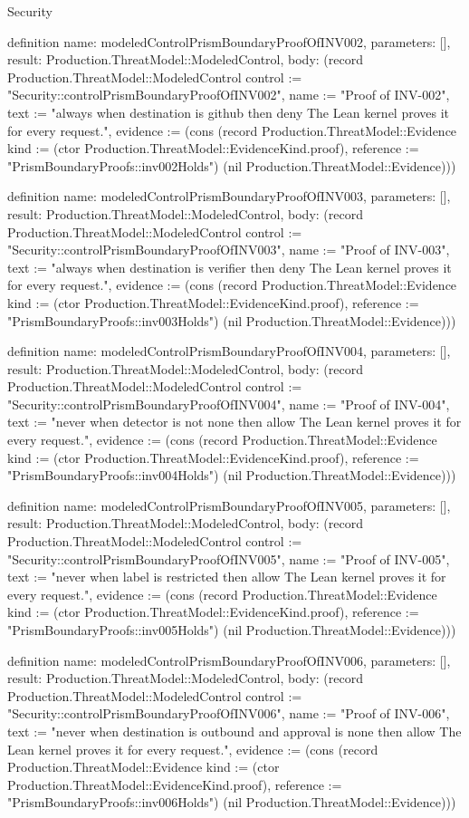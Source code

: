 \begin{lexlean}{Security}
\begin{semanticmodule}
definition{
  name: modeledControlPrismBoundaryProofOfINV002,
  parameters: [],
  result: Production.ThreatModel::ModeledControl,
  body: (record Production.ThreatModel::ModeledControl {control := "Security::controlPrismBoundaryProofOfINV002", name := "Proof of INV-002", text := "always when destination is github then deny The Lean kernel proves it for every request.", evidence := (cons (record Production.ThreatModel::Evidence {kind := (ctor Production.ThreatModel::EvidenceKind.proof), reference := "PrismBoundaryProofs::inv002Holds"}) (nil Production.ThreatModel::Evidence))})
}

definition{
  name: modeledControlPrismBoundaryProofOfINV003,
  parameters: [],
  result: Production.ThreatModel::ModeledControl,
  body: (record Production.ThreatModel::ModeledControl {control := "Security::controlPrismBoundaryProofOfINV003", name := "Proof of INV-003", text := "always when destination is verifier then deny The Lean kernel proves it for every request.", evidence := (cons (record Production.ThreatModel::Evidence {kind := (ctor Production.ThreatModel::EvidenceKind.proof), reference := "PrismBoundaryProofs::inv003Holds"}) (nil Production.ThreatModel::Evidence))})
}

definition{
  name: modeledControlPrismBoundaryProofOfINV004,
  parameters: [],
  result: Production.ThreatModel::ModeledControl,
  body: (record Production.ThreatModel::ModeledControl {control := "Security::controlPrismBoundaryProofOfINV004", name := "Proof of INV-004", text := "never when detector is not none then allow The Lean kernel proves it for every request.", evidence := (cons (record Production.ThreatModel::Evidence {kind := (ctor Production.ThreatModel::EvidenceKind.proof), reference := "PrismBoundaryProofs::inv004Holds"}) (nil Production.ThreatModel::Evidence))})
}

definition{
  name: modeledControlPrismBoundaryProofOfINV005,
  parameters: [],
  result: Production.ThreatModel::ModeledControl,
  body: (record Production.ThreatModel::ModeledControl {control := "Security::controlPrismBoundaryProofOfINV005", name := "Proof of INV-005", text := "never when label is restricted then allow The Lean kernel proves it for every request.", evidence := (cons (record Production.ThreatModel::Evidence {kind := (ctor Production.ThreatModel::EvidenceKind.proof), reference := "PrismBoundaryProofs::inv005Holds"}) (nil Production.ThreatModel::Evidence))})
}

definition{
  name: modeledControlPrismBoundaryProofOfINV006,
  parameters: [],
  result: Production.ThreatModel::ModeledControl,
  body: (record Production.ThreatModel::ModeledControl {control := "Security::controlPrismBoundaryProofOfINV006", name := "Proof of INV-006", text := "never when destination is outbound and approval is none then allow The Lean kernel proves it for every request.", evidence := (cons (record Production.ThreatModel::Evidence {kind := (ctor Production.ThreatModel::EvidenceKind.proof), reference := "PrismBoundaryProofs::inv006Holds"}) (nil Production.ThreatModel::Evidence))})
}


\end{semanticmodule}
\end{lexlean}
